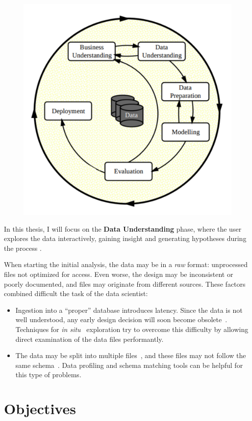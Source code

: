\begin{figure}[htbp]
    \centering
    \includegraphics[width=0.5\linewidth]{images/1_introduction/crisp-dm.pdf}
    \caption{}
    \label{fig:crispdm}
\end{figure}

In this thesis, I will focus on the \textbf{Data Understanding} phase, where the user
explores the data interactively, gaining insight and generating hypotheses during the process \cite{Geer2014}.

When starting the initial analysis, the data may be in a \emph{raw} format: unprocessed files not
optimized for access. Even worse, the design may be inconsistent or poorly documented, and files may
originate from different sources. These factors combined difficult the task of the data scientist:

\begin{itemize}
    \item Ingestion into a ``proper'' database introduces latency. Since the data is not well
        understood, any early design decision will soon become obsolete~\cite{Kersten2011}.
        Techniques for \emph{in situ}~\cite{Idreos2011} exploration try to overcome this difficulty
        by allowing direct examination of the data files performantly.
    \item The data may be split into multiple files~\cite{Baud2012}, and these files may not
        follow the same schema~\cite{Alawini2014}. Data profiling and schema matching tools
        can be helpful for this type of problems.
\end{itemize}

\section{Objectives}


